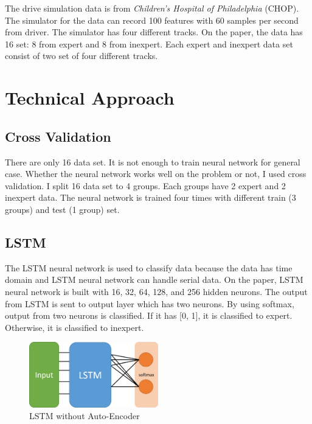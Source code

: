 \documentclass[draft,dvipsnames]{drexel-thesis}
\begin{document}
\begin{thesis}
The drive simulation data is from \textit{Children's Hospital of Philadelphia} (CHOP). The simulator for the data can record 100 features with 60 samples per second from driver. The simulator has four different tracks. On the paper, the data has 16 set: 8 from expert and 8 from inexpert. Each expert and inexpert data set consist of two set of four different tracks.

\chapter{Technical Approach}

\section{Cross Validation}
There are only 16 data set. It is not enough to train neural network for general case. Whether the neural network works well on the problem or not, I used cross validation. I split 16 data set to 4 groups. Each groups have 2 expert and 2 inexpert data. The neural network is trained four times with different train (3 groups) and test (1 group) set. 

\section{LSTM}
The LSTM neural network is used to classify data because the data has time domain and LSTM neural network can handle serial data. On the paper, LSTM neural network is built with 16, 32, 64, 128, and 256 hidden neurons. The output from LSTM is sent to output layer which has two neurons. By using softmax, output from two neurons is classified. If it has [0, 1], it is classified to expert. Otherwise, it is classified to inexpert.

\begin{figure}[H]
    \centering
    \includegraphics[width=0.5\textwidth]{pictures/applied_lstm.png}
    \caption{LSTM without Auto-Encoder}
    \label{fig:Applied LSTM}
\end{figure}


\end{thesis}
\end{document}
